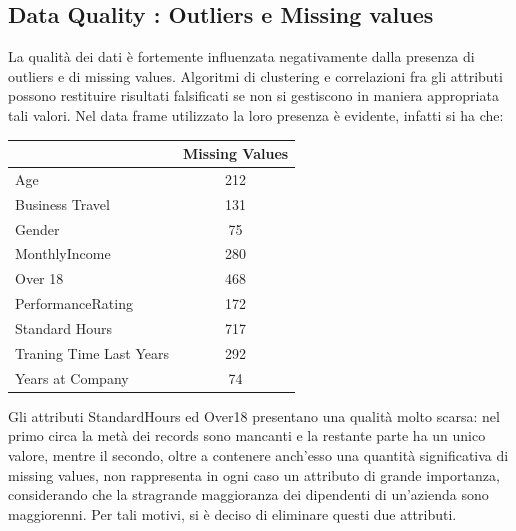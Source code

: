 \documentclass[a4paper,9pt]{article}
\begin{document}
\subsection{Data Quality : Outliers e Missing values}
La qualità dei dati è fortemente influenzata negativamente dalla presenza di outliers e di missing values. Algoritmi di clustering e correlazioni fra gli attributi possono restituire risultati falsificati se non si gestiscono in maniera appropriata tali valori. 
Nel data frame utilizzato la loro presenza è evidente, infatti si ha che:

\begin{center}
\begin{tabular}{lc}
\toprule
 &\bfseries Missing Values \\
\hline
\hline
\rowcolor[gray]{0.9}
Age & 212\\
Business Travel & 131\\
\rowcolor[gray]{0.9}
Gender & 75\\
MonthlyIncome & 280\\
\rowcolor[gray]{0.9}
Over 18 & 468\\
PerformanceRating & 172\\
\rowcolor[gray]{0.9}
Standard Hours & 717\\
Traning Time Last Years & 292\\
\rowcolor[gray]{0.9}
Years at Company & 74\\
\bottomrule
\end{tabular}
\end{center}

Gli attributi StandardHours ed Over18 presentano una qualità molto scarsa: nel primo circa la metà dei records sono mancanti e la restante parte ha un unico valore, mentre il secondo, oltre a contenere anch'esso una quantità significativa di missing values, non rappresenta in ogni caso un attributo di grande importanza, considerando che la stragrande maggioranza dei dipendenti di un'azienda sono maggiorenni. Per tali motivi, si è deciso di eliminare questi due attributi.
\end{document}
